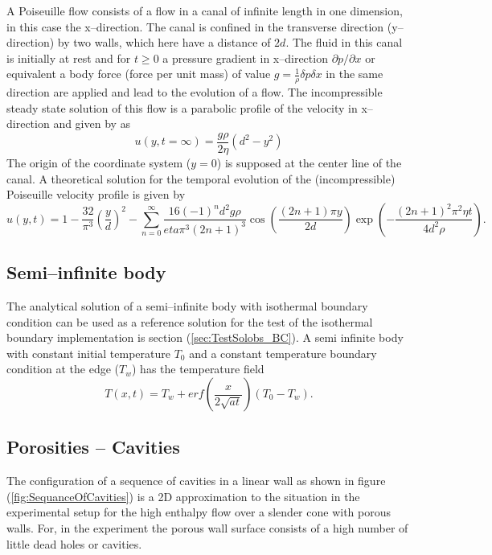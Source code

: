 \documentclass[11pt,a4paper,twoside]{report}
\begin{document}
A Poiseuille flow consists of a flow in a canal of infinite length in one dimension, in this case the x--direction. The canal is confined  in the transverse direction (y--direction) by two walls, which here have a distance of $2d$. The fluid in this canal is initially at rest and for $t\geq0$ a pressure gradient in x--direction $\partial p/\partial x $ or equivalent a body force (force per unit mass) of value $g=\frac{1}{\rho}{\delta p}{\delta x}$ \cite{Sigalotti2003} in the same direction are applied and lead to the evolution of a flow. The incompressible steady state solution of this flow is a parabolic profile of the velocity in x--direction and given by \cite{Sigalotti2003} as
\begin{equation}
\label{eq:Poiseuille_steadyState_U}
 u(y,t=\infty)=\frac{g \rho}{2 \eta}(d^2-y^2)
\end{equation}
The origin of the coordinate system ($y=0$) is supposed at the center line of the canal.
A theoretical solution for the temporal evolution of the (incompressible) Poiseuille velocity profile is given by \cite{Sigalotti2003}
\begin{equation}
\label{eq:Poiseuille_Series}
 u(y,t)=1-\frac{32}{\pi^3}\left(\frac{y}{d}\right)^2 -\sum_{n=0}^\infty \frac{16(-1)^n d^2 g \rho}{eta \pi^3 (2 n +1)^3}\cos \left(\frac{(2n+1)\pi y}{2 d} \right)\exp \left(- \frac{(2n+1)^2\pi^2\eta t}{4d^2\rho} \right).
\end{equation}
 

\subsection{Semi--infinite body}
\label{sec:genIntroSemiInfBody}
The analytical solution of a semi--infinite body with isothermal boundary condition can be used as a reference solution for the test of the isothermal boundary implementation is section (\ref{sec:TestSolobs_BC}).
A semi infinite body with constant initial temperature $T_0$  and a constant temperature boundary condition at the edge ($T_w$) has the temperature field \cite{Carslaw1959}
\begin{equation}
\label{eq:SemiInfBodySolution}
 T(x,t)=T_w+erf \left(\frac{x}{2 \sqrt{at}} \right) \left(T_0-T_w \right).
\end{equation}


\subsection{Porosities -- Cavities}
\label{sec:Porosities_Cavity}
The configuration of a sequence of cavities in a linear wall as shown in figure (\ref{fig:SequanceOfCavities}) is a 2D approximation to the situation in the experimental setup for the high enthalpy flow over a slender cone with porous walls. For, in the experiment the porous wall surface consists of a high number of little dead holes or cavities.
\end{document}
